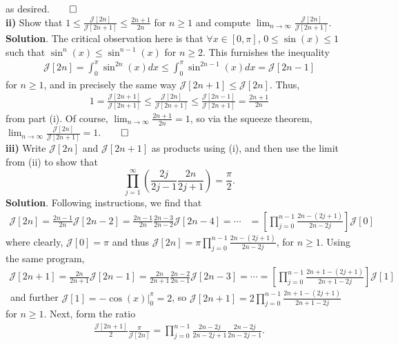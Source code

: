\documentclass[10pt]{article}
\newcommand{\1}[1]{\mathbbm{1}_{#1}}
\newcommand{\mc}[1]{\mathcal{#1}}
\begin{document}
    as desired.\hfill{$\qed$}\\[5pt]
    {\bf ii)} Show that $1\leq \frac{\mc{J}[2n]}{\mc{J}[2n+1]}\leq\frac{2n+1}{2n}$ for $n\geq 1$ and compute $\lim_{n\rightarrow\infty}\frac{\mc{J}[2n]}{\mc{J}[2n+1]}$.\\[5pt]
    {\bf Solution}. The critical observation here is that $\forall x\in[0,\pi]$, $0\leq \sin(x)\leq 1$ such that $\sin^{n}(x)\leq \sin^{n-1}(x)$ for $n\geq 2$. This furnishes the inequality
    \begin{align*}
        \mc{J}[2n]=\int_0^\pi\sin^{2n}(x)dx\leq\int_0^\pi\sin^{2n-1}(x)dx=\mc{J}[2n-1]
    \end{align*}
    for $n\geq 1$, and in precisely the same way $\mc{J}[2n+1]\leq \mc{J}[2n]$. Thus,
    \begin{align*}
        1=\frac{\mc{J}[2n+1]}{\mc{J}[2n+1]}\leq \frac{\mc{J}[2n]}{\mc{J}[2n+1]}\leq \frac{\mc{J}[2n-1]}{\mc{J}[2n+1]}=\frac{2n+1}{2n}
    \end{align*}
    from part (i). Of course, $\lim_{n\rightarrow\infty}\tfrac{2n+1}{2n}=1$, so via the squeeze theorem, $\lim_{n\rightarrow\infty}\tfrac{\mc{J}[2n]}{\mc{J}[2n+1]}=1$.\hfill{$\qed$}\\[5pt]
    {\bf iii)} Write $\mc{J}[2n]$ and $\mc{J}[2n+1]$ as products using (i), and then use the limit from (ii) to show that 
    \[\prod_{j=1}^\infty\left(\frac{2j}{2j-1}\frac{2n}{2j+1}\right)=\frac{\pi}{2}.\]
    {\bf Solution}. Following instructions, we find that
    \begin{align*}
        \mc{J}[2n]=\frac{2n-1}{2n}\mc{J}[2n-2]=\frac{2n-1}{2n}\frac{2n-3}{2n-2}\mc{J}[2n-4]=\cdots&=\left[\prod_{j=0}^{n-1}\frac{2n-(2j+1)}{2n-2j}\right]\mc{J}[0]
    \end{align*}
    where clearly, $\mc{J}[0]=\pi$ and thus $\mc{J}[2n]=\pi \prod_{j=0}^{n-1}\tfrac{2n-(2j+1)}{2n-2j}$, for $n\geq 1$. Using the same program,
    \begin{align*}
        \mc{J}[2n+1]=\frac{2n}{2n+1}\mc{J}[2n-1]=\frac{2n}{2n+1}\frac{2n-2}{2n-1}\mc{J}[2n-3]=\cdots=\left[\prod_{j=0}^{n-1}\frac{2n+1-(2j+1)}{2n+1-2j}\right]\mc{J}[1]
    \end{align*}\
    and further $\mc{J}[1]=-\cos(x)\big|^\pi_0=2$, so $\mc{J}[2n+1]=2\prod_{j=0}^{n-1}\tfrac{2n+1-(2j+1)}{2n+1-2j}$ for $n\geq 1$. Next, form the ratio
    \begin{align*}
        \frac{\mc{J}[2n+1]}{2}\frac{\pi}{\mc{J}[2n]}=\prod_{j=0}^{n-1}\frac{2n-2j}{2n-2j+1}\frac{2n-2j}{2n-2j-1}.
    \end{align*}
\end{document}

